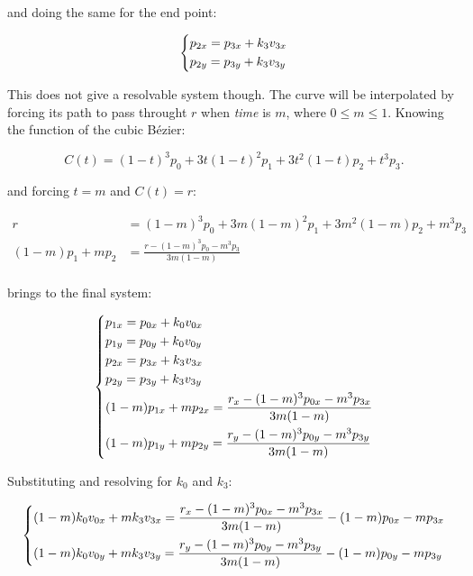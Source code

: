 \documentclass{scrartcl}
\begin{document}
and doing the same for the end point:

\begin{equation*}
\begin{dcases}
    p_{2x} = p_{3x} + k_3 v_{3x} \\
    p_{2y} = p_{3y} + k_3 v_{3y} \\
\end{dcases}
\end{equation*}

This does not give a resolvable system though. The curve will be
interpolated by forcing its path to pass throught $r$ when
\textit{time} is $m$, where $0 \leq m \leq 1$. Knowing the function of
the cubic Bézier:

\begin{equation*}
C(t) = (1-t)^3p_0 + 3t(1-t)^2p_1 + 3t^2(1-t)p_2 + t^3p_3.
\end{equation*}

and forcing $t = m$ and $C(t) = r$:

\begin{equation*}
\begin{split}
    r &= (1-m)^3 p_0 + 3m(1-m)^2 p_1 + 3m^2 (1-m) p_2 + m^3 p_3 \\
    (1-m) p_1 + m p_2 &= \frac{r - (1-m)^3p_0 - m^3p_3}{3m (1-m)} \\
\end{split}
\end{equation*}

brings to the final system:

\begin{equation*}
\begin{dcases}
    p_{1x} = p_{0x} + k_0 v_{0x} \\
    p_{1y} = p_{0y} + k_0 v_{0y} \\
    p_{2x} = p_{3x} + k_3 v_{3x} \\
    p_{2y} = p_{3y} + k_3 v_{3y} \\
    (1-m) p_{1x} + m p_{2x} = \frac{r_x - (1-m)^3 p_{0x} - m^3 p_{3x}}{3m (1-m)} \\
    (1-m) p_{1y} + m p_{2y} = \frac{r_y - (1-m)^3 p_{0y} - m^3 p_{3y}}{3m (1-m)} \\
\end{dcases}
\end{equation*}

Substituting and resolving for $k_0$ and $k_3$:

\begin{equation*}
\begin{dcases}
    (1-m) k_0 v_{0x} + m k_3 v_{3x} = \frac{r_x - (1-m)^3 p_{0x} - m^3 p_{3x}}{3m (1-m)} - (1-m) p_{0x} - m p_{3x} \\
    (1-m) k_0 v_{0y} + m k_3 v_{3y} = \frac{r_y - (1-m)^3 p_{0y} - m^3 p_{3y}}{3m (1-m)} - (1-m) p_{0y} - m p_{3y} \\
\end{dcases}
\end{equation*}
\end{document}
